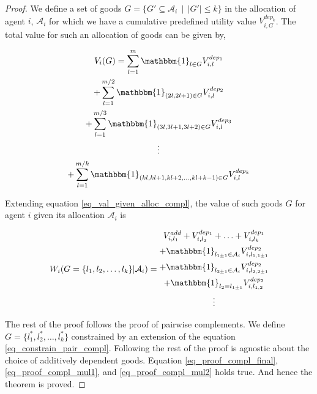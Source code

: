 \begin{proof}

We define a set of goods $G = \{G' \subseteq \mathcal{A}_i \, \mid \, |G'| \leq k\}$ in the allocation of agent $i$, $\mathcal{A}_i$ for which we have a cumulative predefined utility value $V_{i,G}^{dep_k}$. The total value for such an allocation of goods can be given by,

\[
    \begin{gathered}
        V_i(G) = \sum_{l=1}^m \mathbbm{1}_{l \in G}V_{i,l}^{dep_1} \\
        + \sum_{l=1}^{m/2} \mathbbm{1}_{\left(2l,2l+1\right) \in G}V_{i,l}^{dep_2} \\
        + \sum_{l=1}^{m/3} \mathbbm{1}_{\left(3l,3l+1,3l+2\right) \in G}V_{i,l}^{dep_3} \\
        \vdots \\
        + \sum_{l=1}^{m/k} \mathbbm{1}_{\left(kl,kl+1,kl+2,\dotsc,kl+k-1\right) \in G}V_{i,l}^{dep_k}
    \end{gathered}
\]

Extending equation \ref{eq_val_given_alloc_compl}, the value of such goods $G$ for agent $i$ given its allocation $\mathcal{A}_i$ is

\begin{equation}
\label{eq_val_given_alloc_dep}
    W_i(G=\{l_1,l_2,\dotsc,l_k\} | \mathcal{A}_i) = 
    \begin{gathered}
        V_{i,l_1}^{add} + V_{i,l_2}^{dep_1} + \dotsc + V_{i, l_k}^{dep_1}\\
        + \mathbbm{1}_{l_{1 \pm 1} \in \mathcal{A}_i}V_{i,l_{1,1\pm 1}}^{dep_2} \\
        + \mathbbm{1}_{l_{2 \pm 1} \in \mathcal{A}_i}V_{i,l_{2,2\pm 1}}^{dep_2} \\
        + \mathbbm{1}_{l_2 = l_{1 \pm 1}}V_{i,l_{1,2}}^{dep_2} \\
        \vdots \\
    \end{gathered}
\end{equation}

The rest of the proof follows the proof of pairwise complements. We define $G = \{l_1^*, l_2^*,\dotsc,l_k^*\}$ constrained by an extension of the equation \ref{eq_constrain_pair_compl}. Following the rest of the proof is agnostic about the choice of additively dependent goods. Equation \ref{eq_proof_compl_final}, \ref{eq_proof_compl_mul1}, and \ref{eq_proof_compl_mul2} holds true. And hence the theorem is proved.

\end{proof}

